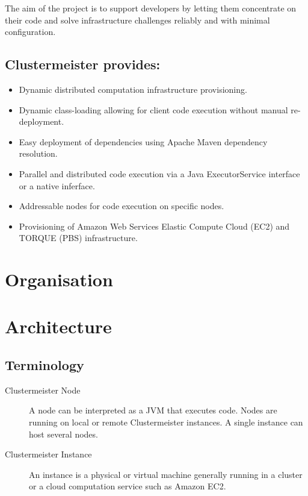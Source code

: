 \documentclass{article}
\begin{document}
The aim of the project is to support developers by letting them concentrate on their code and solve infrastructure challenges reliably and with minimal configuration.

\subsection*{Clustermeister provides:}
\begin{itemize}
\item Dynamic distributed computation infrastructure provisioning.
\item Dynamic class-loading allowing for client code execution without manual re-deployment.
\item Easy deployment of dependencies using Apache Maven dependency resolution.
\item Parallel and distributed code execution via a Java ExecutorService interface or a native inferface.
\item Addressable nodes for code execution on specific nodes.
\item Provisioning of Amazon Web Services Elastic Compute Cloud (EC2) and TORQUE (PBS) infrastructure.
\end{itemize}

\section{Organisation}



\section{Architecture}

\subsection{Terminology}

\begin{description}
\item[Clustermeister Node] A node can be interpreted as a JVM that executes code. Nodes are running on local or remote Clustermeister instances. A single instance can host several nodes.
\item[Clustermeister Instance] An instance is a physical or virtual machine generally running in a cluster or a cloud computation service such as Amazon EC2.
\end{description}
\end{document}
